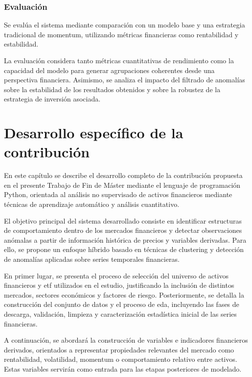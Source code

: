 \documentclass[
]{article}
\begin{document}
\subsubsection{Evaluación}

Se evalúa el sistema mediante comparación con un modelo base y una estrategia
tradicional de \gls{momentum}, utilizando métricas financieras como
rentabilidad y estabilidad.

La evaluación considera tanto métricas cuantitativas de rendimiento como
la capacidad del modelo para generar agrupaciones coherentes desde una
perspectiva financiera. Asimismo, se analiza el impacto del filtrado de
anomalías sobre la estabilidad de los resultados obtenidos y sobre la
robustez de la estrategia de inversión asociada.


\newpage
\section{Desarrollo específico de la contribución}\label{desarollo-especi}

En este capítulo se describe el desarrollo completo de la contribución propuesta en el presente Trabajo de Fin de Máster mediante el lenguaje de programación Python, orientada al análisis no supervisado de activos financieros mediante técnicas de aprendizaje automático y análisis cuantitativo.

El objetivo principal del sistema desarrollado consiste en identificar estructuras de comportamiento dentro de los mercados financieros y detectar observaciones anómalas a partir de información histórica de precios y variables derivadas. Para ello, se propone un enfoque híbrido basado en técnicas de \gls{clustering} y detección de anomalías aplicadas sobre series temporales financieras.

En primer lugar, se presenta el proceso de selección del universo de activos financieros y \gls{etf} utilizados en el estudio, justificando la inclusión de distintos mercados, sectores económicos y factores de riesgo. Posteriormente, se detalla la construcción del conjunto de datos y el proceso de \gls{eda}, incluyendo las fases de descarga, validación, limpieza y caracterización estadística inicial de las series financieras.

A continuación, se abordará la construcción de variables e indicadores financieros derivados, orientados a representar propiedades relevantes del mercado como rentabilidad, volatilidad, \gls{momentum} o comportamiento relativo entre activos. Estas variables servirán como entrada para las etapas posteriores de modelado.
\end{document}
